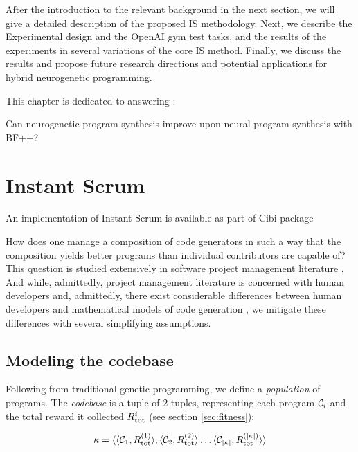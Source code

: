 After the introduction to the relevant background in the next section, we will give a detailed description of the proposed IS methodology. Next, we describe the Experimental design and the OpenAI gym test tasks, and the results of the experiments in several variations of the core IS method. Finally, we discuss the results and propose future research directions and potential applications for hybrid neurogenetic programming. 

This chapter is dedicated to answering \rqneurogen:

\begin{highlight}
    Can neurogenetic program synthesis improve upon neural program synthesis with BF++?
\end{highlight}

\newpage
\section{Instant Scrum}

\begin{remark}
    An implementation of Instant Scrum is available as part of Cibi \cite{liventsevVadim0x60Cibi2024} package
\end{remark}

How does one manage a composition of code generators in such a way that the composition yields better programs than individual contributors are capable of? 
This question is studied extensively in software project management literature \cite{mythicalmanmonth}.
And while, admittedly, project management literature is concerned with human developers and, admittedly, there exist considerable differences between human developers and mathematical models of code generation \cite{bugfixing}, we mitigate these differences with several simplifying assumptions.

\subsection{Modeling the codebase}

Following from traditional genetic programming, we define a \emph{population} of programs. 
The \emph{codebase} is a tuple of 2-tuples, representing each program $\mathcal{C}_i$ and the total reward it collected $R_\text{tot}^i$ (see section \ref{sec:fitness}):

\begin{equation}
    \kappa = \langle \langle \mathcal{C}_1, R_\text{tot}^{(1)} \rangle, \langle \mathcal{C}_2, R_\text{tot}^{(2)} \rangle \dots \langle \mathcal{C}_{|\kappa|}, R_\text{tot}^{(|\kappa|)} \rangle \rangle
\end{equation}


